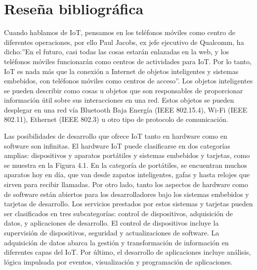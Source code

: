 \newpage
\chapter{Reseña bibliográfica}

Cuando hablamos de IoT, pensamos en los teléfonos móviles como centro de diferentes operaciones, por ello Paul Jacobs, ex jefe ejecutivo de Qualcomm, ha dicho:''En el futuro, casi todas las cosas estarán enlazadas en la web, y los teléfonos móviles funcionarán como centros de actividades para IoT. Por lo tanto, IoT es nada más que la conexión a Internet de objetos inteligentes y sistemas embebidos, con teléfonos móviles como centros de acceso''. Los objetos inteligentes se pueden describir como cosas u objetos que son responsables de proporcionar información útil sobre sus interacciones en una red. Estos objetos se pueden desplegar en una red vía Bluetooth Baja Energía (IEEE 802.15.4), Wi-Fi (IEEE 802.11), Ethernet (IEEE 802.3) u otro tipo de protocolo de comunicación.

Las posibilidades de desarrollo que ofrece IoT tanto en hardware como en software son infinitas. El hardware IoT puede clasificarse en dos categorías amplias: dispositivos y aparatos portátiles y
sistemas embebidos y tarjetas, como se muestra en la Figura 4.1.
En la categoría de portátiles, se encuentran muchos aparatos hoy en día, que van desde zapatos inteligentes, gafas y hasta relojes que sirven para recibir llamadas.
Por otro lado, tanto los aspectos de hardware como de software están abiertos para los desarrolladores bajo los sistemas embebidos y
tarjetas de desarrollo. Los servicios prestados por estos sistemas y
tarjetas pueden ser clasificados en tres subcategorías: control de dispositivos, adquisición de datos, y aplicaciones de desarrollo. El control de dispositivos incluye la supervisión de dispositivos, seguridad y actualizaciones de software. La adquisición de datos abarca la gestión y transformación de información en diferentes capas del IoT. Por último, el desarrollo de aplicaciones incluye análisis, lógica impulsada por eventos, visualización y programación de aplicaciones.\cite{7879392}

